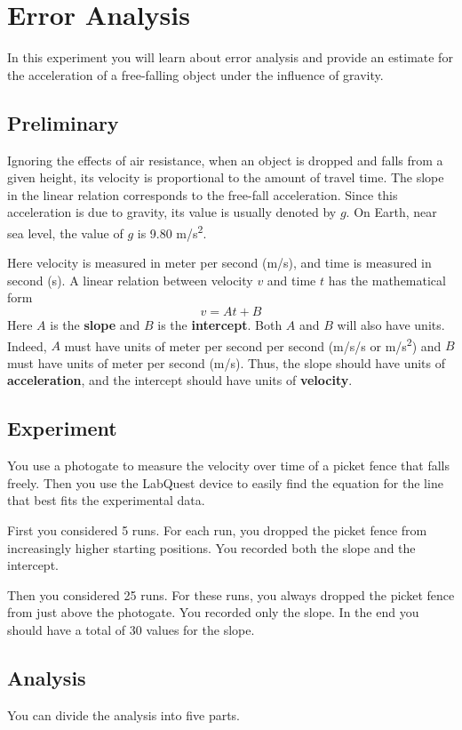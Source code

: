 \setcounter{chapter}{0}
\chapter{Error Analysis}
%
In this experiment you will learn about error analysis and provide an estimate for the acceleration of a free-falling object under the influence of gravity.
%
\section{Preliminary}
%
Ignoring the effects of air resistance, when an object is dropped and falls from a given height, its velocity is proportional to the amount of travel time. The slope in the linear relation corresponds to the free-fall acceleration. Since this acceleration is due to gravity, its value is usually denoted by $g$. On Earth, near sea level, the value of $g$ is 9.80 m/s\textsuperscript{2}.

Here velocity is measured in meter per second (m/s), and time is measured in second (s). A linear relation between velocity $v$ and time $t$ has the mathematical form
\begin{equation}
    v = A t + B
\end{equation}
Here $A$ is the \textbf{slope} and $B$ is the \textbf{intercept}. Both $A$ and $B$ will also have units. Indeed, $A$ must have units of meter per second per second (m/s/s or m/s\textsuperscript{2}) and $B$ must have units of meter per second (m/s). Thus, the slope should have units of \textbf{acceleration}, and the intercept should have units of \textbf{velocity}.
%
\section{Experiment}
%
You use a photogate to measure the velocity over time of a picket fence that falls freely. Then you use the LabQuest device to easily find the equation for the line that best fits the experimental data.

First you considered 5 runs. For each run, you dropped the picket fence from increasingly higher starting positions. You recorded both the slope and the intercept.

Then you considered 25 runs. For these runs, you always dropped the picket fence from just above the photogate. You recorded only the slope. In the end you should have a total of 30 values for the slope.
%
\section{Analysis}
%
You can divide the analysis into five parts.
%
